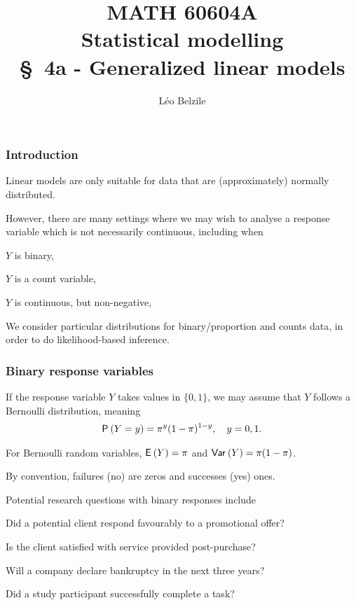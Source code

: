 \documentclass{beamer}
\title[\color{white}{MATH 60604A \S~4a - Generalized linear models}]{\texorpdfstring{MATH 60604A \\Statistical modelling \\ \S~4a - Generalized linear models}{MATH 60604A \\Statistical modelling \\ \S~4a - Generalized linear models}}
\author{Léo Belzile}
\institute{HEC Montréal\\
Department of Decision Sciences}
\date{}
\begin{document}
\frame{\titlepage}
\begin{frame}
\frametitle{Introduction}
\bi
\item Linear models are only suitable for data that are (approximately) normally distributed. 
\item However, there are many settings where we may wish to analyse a response variable which is not necessarily continuous, including when
\bi
\item $Y$ is \alert{binary}, 
\item $Y$ is a \alert{count} variable, 
\item $Y$ is \alert{continuous, but non-negative}, 
\ei
\item We consider particular distributions for binary/proportion and counts data, in order to do likelihood-based inference.
\ei
\end{frame}


\begin{frame}
\frametitle{Binary response variables}
\bi
\item If the response variable $Y$ takes values in $\{0, 1\}$, we may assume that $Y$ follows a \alert{Bernoulli} distribution, meaning
\begin{align*}
\P{Y=y} = \pi^y (1-\pi)^{1-y}, \quad y=0, 1.
\end{align*}
\item For Bernoulli random variables, $\E{Y}=\pi$ and $\Va{Y}=\pi(1-\pi)$.
\item By convention, failures (no) are zeros and  successes (yes) ones.
\item Potential research questions with binary responses include
\bi
\item Did a potential client respond favourably to a promotional offer?
\item Is the client satisfied with service provided post-purchase?
\item Will a company declare bankruptcy in the next three years?
\item Did a study participant successfully complete a task?
\ei
\ei
\end{frame}
\end{document}
